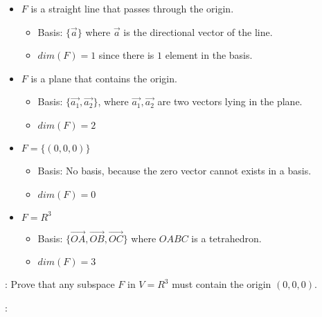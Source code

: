     \begin{itemize}
      \item $F$ is a straight line that passes through the origin.
        \begin{itemize}
          \item Basis: $\{\vec{a}\}$ where $\vec{a}$ is the
            directional vector of the line.
          \item $dim(F) = 1$ since there is $1$ element in the basis.
        \end{itemize}
      \item $F$ is a plane that contains the origin.
        \begin{itemize}
          \item Basis: $\{\vec{a_{1}}, \vec{a_{2}}\}$, where
            $\vec{a_{1}}, \vec{a_{2}}$ are two vectors lying in
            the plane.
          \item $dim(F) = 2$
        \end{itemize}
      \item $F = \{(0, 0, 0)\}$
        \begin{itemize}
          \item Basis: No basis, because the zero vector cannot exists
            in a basis.
          \item $dim(F) = 0$
        \end{itemize}
      \item $F = R^{3}$
        \begin{itemize}
          \item Basis: $\{\vec{OA}, \vec{OB}, \vec{OC}\}$ where
            $OABC$ is a tetrahedron.
          \item $dim(F) = 3$
        \end{itemize}
    \end{itemize}

    \par {}: Prove that any subspace $F$ in $V = R^{3}$ must contain
      the origin $(0, 0, 0)$.
    \par {}: \\

